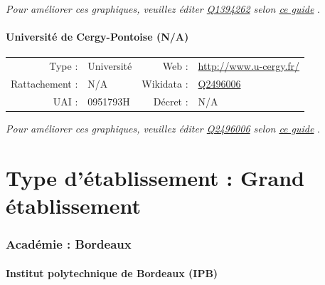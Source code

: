 \documentclass[12pt,french,landscape]{article}
\begin{document}
\textit{\scriptsize Pour améliorer ces graphiques, veuillez éditer \href{https://www.wikidata.org/entity/Q1394262}{Q1394262}  selon \href{https://github.com/cpesr/wikidataESR/blob/master/Rmd/wikidataESR.md}{ce guide}}
.


\newpage

\hypertarget{universituxe9-de-cergy-pontoise-na}{%
\subsection{Université de Cergy-Pontoise
(N/A)}\label{universituxe9-de-cergy-pontoise-na}}

\begin{tabular*}{0.45\textwidth}{rp{2cm}rl}  
\hline  
Type : & Université & Web : &\href{http://www.u-cergy.fr/}{http://www.u-cergy.fr/} \\  
Rattachement : & N/A & Wikidata : & \href{https://www.wikidata.org/entity/Q2496006}{Q2496006} \\  
UAI : & 0951793H & Décret : & N/A \\  
\hline  
\end{tabular*}

\textit{\scriptsize Pour améliorer ces graphiques, veuillez éditer \href{https://www.wikidata.org/entity/Q2496006}{Q2496006}  selon \href{https://github.com/cpesr/wikidataESR/blob/master/Rmd/wikidataESR.md}{ce guide}}
.


\newpage   
\vspace*{5cm}   
\part{Type d'établissement :  Grand établissement }   
\newpage

\hypertarget{acaduxe9mie-bordeaux-1}{%
\section{Académie : Bordeaux}\label{acaduxe9mie-bordeaux-1}}

\hypertarget{institut-polytechnique-de-bordeaux-ipb}{%
\subsection{Institut polytechnique de Bordeaux
(IPB)}\label{institut-polytechnique-de-bordeaux-ipb}}
\end{document}

